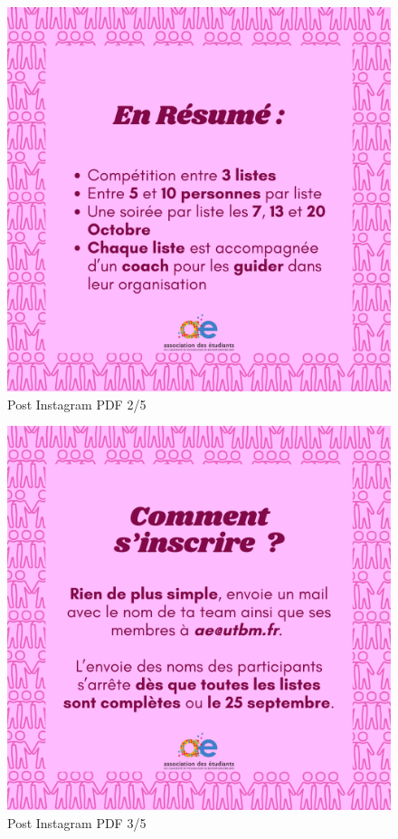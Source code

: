 \begin{figure}[!h]
    \begin{center}
        \includegraphics[scale=0.2]{ressources/post pdf/19}
        \caption{Post Instagram \gls{PDF} 2/5 \label{fig:pdf2}}
    \end{center}
\end{figure}

\newpage

\begin{figure}[!h]
    \begin{center}
        \includegraphics[scale=0.2]{ressources/post pdf/20}
        \caption{Post Instagram \gls{PDF} 3/5 \label{fig:pdf3}}
    \end{center}
\end{figure}

